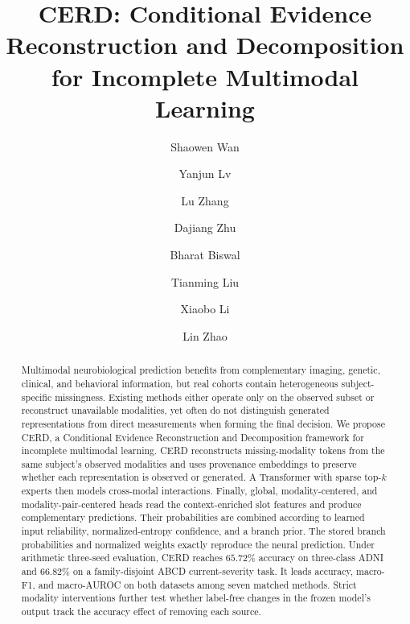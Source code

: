 \documentclass[a4paper,fleqn]{cas-dc}
\begin{document}
\let\WriteBookmarks\relax
\def\floatpagepagefraction{1}
\def\textpagefraction{.001}

\title[mode=title]{CERD: Conditional Evidence Reconstruction and Decomposition for Incomplete Multimodal Learning}

\author[1]{Shaowen Wan}
\author[2]{Yanjun Lv}
\author[3]{Lu Zhang}
\author[2]{Dajiang Zhu}
\author[1]{Bharat Biswal}
\author[4]{Tianming Liu}
\author[1]{Xiaobo Li}
\author[1]{Lin Zhao}
\cormark[1]






\begin{abstract}
Multimodal neurobiological prediction benefits from complementary imaging, genetic, clinical, and behavioral information, but real cohorts contain heterogeneous subject-specific missingness. Existing methods either operate only on the observed subset or reconstruct unavailable modalities, yet often do not distinguish generated representations from direct measurements when forming the final decision. We propose CERD, a Conditional Evidence Reconstruction and Decomposition framework for incomplete multimodal learning. CERD reconstructs missing-modality tokens from the same subject's observed modalities and uses provenance embeddings to preserve whether each representation is observed or generated. A Transformer with sparse top-\(k\) experts then models cross-modal interactions. Finally, global, modality-centered, and modality-pair-centered heads read the context-enriched slot features and produce complementary predictions. Their probabilities are combined according to learned input reliability, normalized-entropy confidence, and a branch prior. The stored branch probabilities and normalized weights exactly reproduce the neural prediction. Under arithmetic three-seed evaluation, CERD reaches \(65.72\%\) accuracy on three-class ADNI and \(66.82\%\) on a family-disjoint ABCD current-severity task. It leads accuracy, macro-F1, and macro-AUROC on both datasets among seven matched methods. Strict modality interventions further test whether label-free changes in the frozen model's output track the accuracy effect of removing each source.
\end{abstract}
\end{document}
